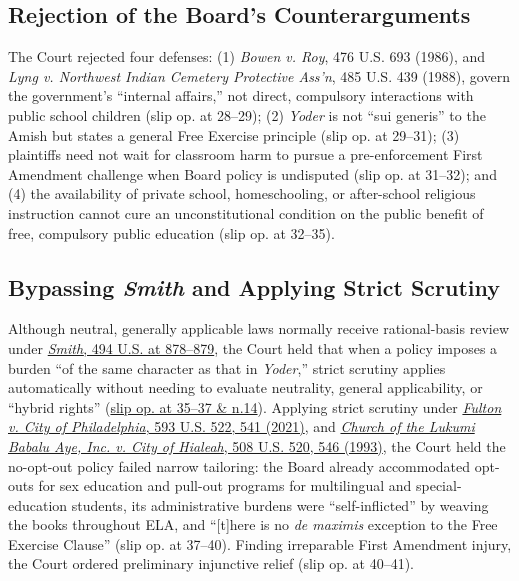 \documentclass[12pt]{article}
\begin{document}
\subsection{Rejection of the Board's Counterarguments}
The Court rejected four defenses: (1) \textit{Bowen v. Roy}, 476 U.S. 693 (1986), and \textit{Lyng v. Northwest Indian Cemetery Protective Ass'n}, 485 U.S. 439 (1988), govern the government's ``internal affairs,'' not direct, compulsory interactions with public school children (slip op. at 28--29); (2) \textit{Yoder} is not ``sui generis'' to the Amish but states a general Free Exercise principle (slip op. at 29--31); (3) plaintiffs need not wait for classroom harm to pursue a pre-enforcement First Amendment challenge when Board policy is undisputed (slip op. at 31--32); and (4) the availability of private school, homeschooling, or after-school religious instruction cannot cure an unconstitutional condition on the public benefit of free, compulsory public education (slip op. at 32--35).

\subsection{Bypassing \textit{Smith} and Applying Strict Scrutiny}
Although neutral, generally applicable laws normally receive rational-basis review under \href{https://supreme.justia.com/cases/federal/us/494/872/}{\textit{Smith}, 494 U.S. at 878--879}, the Court held that when a policy imposes a burden ``of the same character as that in \textit{Yoder},'' strict scrutiny applies automatically without needing to evaluate neutrality, general applicability, or ``hybrid rights'' (\href{https://www.law.cornell.edu/supremecourt/text/24-297}{slip op. at 35--37 \& n.14}). Applying strict scrutiny under \href{https://supreme.justia.com/cases/federal/us/593/19-123/}{\textit{Fulton v. City of Philadelphia}, 593 U.S. 522, 541 (2021)}, and \href{https://supreme.justia.com/cases/federal/us/508/520/}{\textit{Church of the Lukumi Babalu Aye, Inc. v. City of Hialeah}, 508 U.S. 520, 546 (1993)}, the Court held the no-opt-out policy failed narrow tailoring: the Board already accommodated opt-outs for sex education and pull-out programs for multilingual and special-education students, its administrative burdens were ``self-inflicted'' by weaving the books throughout ELA, and ``[t]here is no \textit{de maximis} exception to the Free Exercise Clause'' (slip op. at 37--40). Finding irreparable First Amendment injury, the Court ordered preliminary injunctive relief (slip op. at 40--41).
\end{document}
